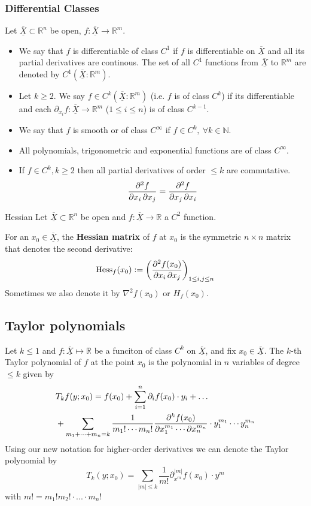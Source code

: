 \documentclass[a4paper,fontsize = 10pt]{article}
\def\R{\mathbb{R}}
\def\N{\mathbb{N}}
\def\X{\underline{\overline{X}}}
\begin{document}
\subsubsection*{Differential Classes}
    Let \(\X \subset \R^n\) be open, $f : \X \to \R^m$. 
    \begin{itemize}
        \item We say that $f$ is differentiable of class $C^1$ if $f$ is differentiable on $\X$ and all its partial derivatives are continous. The set of all $C^1$ functions from $\X$ to $\R^m$ are denoted by $C^1(\X:\R^m)$.
        \item Let $k \geq 2$. We say $f \in C^k(\X:\R^m)$ (i.e. $f$ is of class $C^k$) if its differentiable and each $\partial_{x_i}f: \X \to \R^m$ ($1 \leq i \leq n$) is of class $C^{k-1}$.
        \item We say that $f$ is smooth or of class $C^\infty$ if $f \in C^k, \ \forall k \in \N$.
        \item All polynomials, trigonometric and exponential functions are of class $C^\infty$.
        \item If $f \in C^k, k \geq 2$ then all partial derivatives of order $\leq k$ are commutative.
        $$\pdv{f}{x_i, x_j} = \pdv{f}{ x_j, x_i}$$
    \end{itemize}

\begin{mainbox}{Hessian}
    Let $\X \subset \R^n$ be open and $f: \X \to \R$ a $C^2$ function.

    For an $x_0 \in \X$, the \textbf{Hessian matrix} of $f$ at $x_0$ is the symmetric \(n \times n\) matrix that denotes the second derivative:
    \[\text{Hess}_f(x_0) := \left(\pdv{f(x_0)}{x_i, x_j}\right)_{1\le i,j \le n}\] 
    Sometimes we also denote it by $\nabla^2f(x_0)$ or $H_f(x_0)$.
\end{mainbox}
\subsection{Taylor polynomials}
Let \(k \le 1\) and \(f: \X \mapsto \R\) be a funciton of class \(C^k\) on \(\X\), and fix \(x_0 \in \X\). The \(k\)-th Taylor polynomial of \(f\) at the point \(x_0\) is the polynomial in \(n\) variables of degree \(\le k\) given by
\begin{align*}
  &T_k f(y; x_0) = f(x_0) + \sum_{i=1}^n \partial_i f(x_0) \cdot y_i + \dots \\
  &+ \sum_{m_1 + \cdots + m_n = k} \frac{1}{m_1! \cdots m_n!} \pdv{^k f(x_0) }{x_1^{m_1} \cdots \partial x_n^{m_n}} \cdot y_1^{m_1} \cdots y_n^{m_n}
\end{align*}
Using our new notation for higher-order derivatives we can denote the Taylor polynomial by
\[T_k(y; x_0) = \sum_{|m| \leq k} \frac{1}{m!}\partial_{x^m}^{|m|}f(x_0)\cdot y^m\]
with $m! = m_1!m_2!\cdot ... \cdot m_n!$
\end{document}
